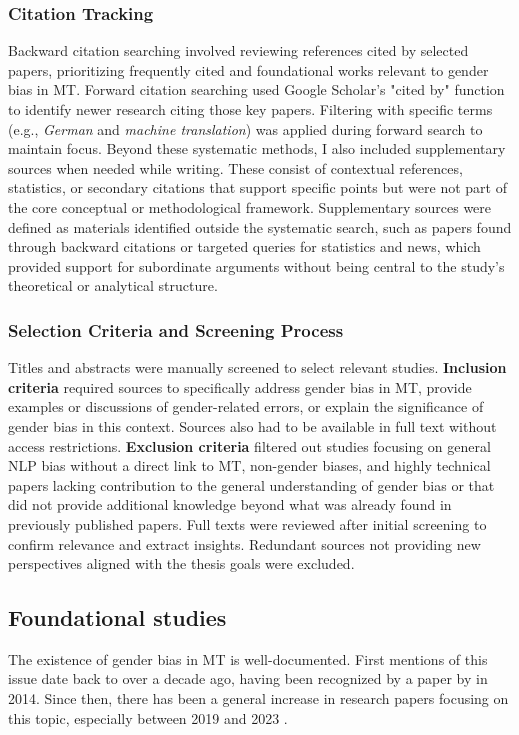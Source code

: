     \subsubsection{Citation Tracking}
    Backward citation searching involved reviewing references cited by selected papers, prioritizing frequently cited and foundational works relevant to gender bias in MT. Forward citation searching used Google Scholar's "cited by" function to identify newer research citing those key papers. Filtering with specific terms (e.g., \textit{German} and \textit{machine translation}) was applied during forward search to maintain focus. Beyond these systematic methods, I also included supplementary sources when needed while writing. These consist of contextual references, statistics, or secondary citations that support specific points but were not part of the core conceptual or methodological framework. Supplementary sources were defined as materials identified outside the systematic search, such as papers found through backward citations or targeted queries for statistics and news, which provided support for subordinate arguments without being central to the study's theoretical or analytical structure.

    \subsubsection{Selection Criteria and Screening Process}\label{subsection:selection_criteria}
    Titles and abstracts were manually screened to select relevant studies. \textbf{Inclusion criteria} required sources to specifically address gender bias in MT, provide examples or discussions of gender-related errors, or explain the significance of gender bias in this context. Sources also had to be available in full text without access restrictions. \textbf{Exclusion criteria} filtered out studies focusing on general NLP bias without a direct link to MT, non-gender biases, and highly technical papers lacking contribution to the general understanding of gender bias or that did not provide additional knowledge beyond what was already found in previously published papers. Full texts were reviewed after initial screening to confirm relevance and extract insights. Redundant sources not providing new perspectives aligned with the thesis goals were excluded.

\subsection{Foundational studies}
    The existence of gender bias in MT is well-documented. First mentions of this issue date back to over a decade ago, having been recognized by a paper by \citeauthor{schiebingerScientificResearchMust2014} in 2014. Since then, there has been a general increase in research papers focusing on this topic, especially between 2019 and 2023 \citep{savoldiDecadeGenderBias2025}. 

